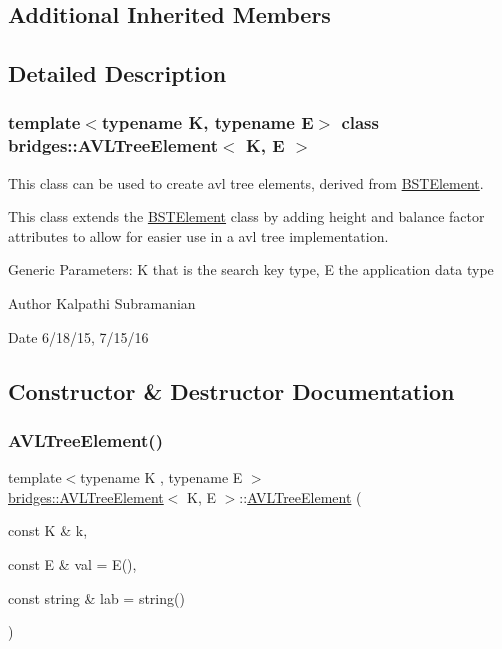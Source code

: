 \subsection*{Additional Inherited Members}


\subsection{Detailed Description}
\subsubsection*{template$<$typename K, typename E$>$\newline
class bridges\+::\+A\+V\+L\+Tree\+Element$<$ K, E $>$}

This class can be used to create avl tree elements, derived from \mbox{\hyperlink{classbridges_1_1_b_s_t_element}{B\+S\+T\+Element}}. 

This class extends the \mbox{\hyperlink{classbridges_1_1_b_s_t_element}{B\+S\+T\+Element}} class by adding height and balance factor attributes to allow for easier use in a avl tree implementation.

Generic Parameters\+: K that is the search key type, E the application data type

\begin{DoxyAuthor}{Author}
Kalpathi Subramanian 
\end{DoxyAuthor}
\begin{DoxyDate}{Date}
6/18/15, 7/15/16 
\end{DoxyDate}


\subsection{Constructor \& Destructor Documentation}
\mbox{\label{classbridges_1_1_a_v_l_tree_element_a24d1dfb65f00f2fef96a57a3f869a263}} 
\subsubsection{\texorpdfstring{A\+V\+L\+Tree\+Element()}{AVLTreeElement()}}
{\footnotesize\ttfamily template$<$typename K , typename E $>$ \\
\mbox{\hyperlink{classbridges_1_1_a_v_l_tree_element}{bridges\+::\+A\+V\+L\+Tree\+Element}}$<$ K, E $>$\+::\mbox{\hyperlink{classbridges_1_1_a_v_l_tree_element}{A\+V\+L\+Tree\+Element}} (\begin{DoxyParamCaption}\item[{const K \&}]{k,  }\item[{const E \&}]{val = {\ttfamily E()},  }\item[{const string \&}]{lab = {\ttfamily string()} }\end{DoxyParamCaption})\hspace{0.3cm}{\ttfamily [inline]}}


